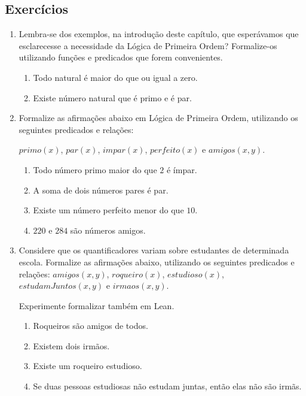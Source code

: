     \subsection{Exercícios}

    \begin{enumerate}
        \item Lembra-se dos exemplos, na introdução deste capítulo, que esperávamos que esclarecesse a necessidade da Lógica de Primeira Ordem?
        Formalize-os utilizando funções e predicados que forem convenientes.
        
        \begin{enumerate}
            \item Todo natural é maior do que ou igual a zero.
            \item Existe número natural que é primo e é par.
        \end{enumerate}

        \item Formalize as afirmações abaixo em Lógica de Primeira Ordem, utilizando os seguintes predicados e relações:

        $primo(x)$, $par(x)$, $impar(x)$, $perfeito(x)$ e $amigos(x, y)$.

        \begin{enumerate}
            \item Todo número primo maior do que $2$ é ímpar.
            \item A soma de dois números pares é par.
            \item Existe um número perfeito menor do que $10$.
            \item $220$ e $284$ são números amigos.
        \end{enumerate}

        \item Considere que os quantificadores variam sobre estudantes de determinada escola. Formalize as afirmações abaixo, utilizando os seguintes predicados e relações:
        $amigos(x, y)$, $roqueiro(x)$, $estudioso(x)$, $estudamJuntos(x, y)$ e $irmaos(x, y)$.
        
        Experimente formalizar também em Lean.
        \begin{enumerate}
            \item Roqueiros são amigos de todos.
            \item Existem dois irmãos.
            \item Existe um roqueiro estudioso.
            \item Se duas pessoas estudiosas não estudam juntas, então elas não são irmãs.
        \end{enumerate}
    \end{enumerate}

